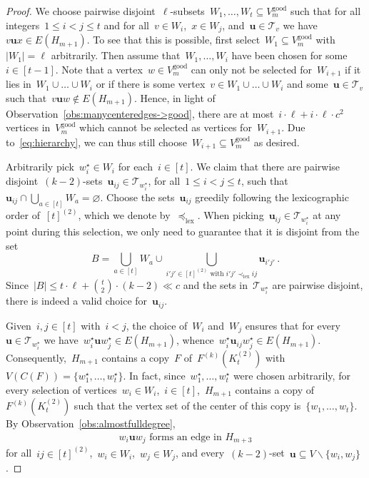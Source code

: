 \documentclass[10pt,a4paper]{amsart}
\let\emptyset=\varnothing
\let\setminus=\smallsetminus
\let\setminus=\smallsetminus
\newcommand{\cT}{\mathcal{T}}
\begin{document}
	\begin{proof}
		
		We choose pairwise disjoint~$\ell$-subsets~$W_1, \ldots, W_t \subseteq V_m^{\text{good}}$ such that for all integers~$1\leq i<j\leq t$ and for all~$v\in W_i$,~$x\in W_j$, and~$\mathbf{u}\in\cT_v$ we have $v\mathbf{u} x\in E(H_{m+1})$.
		To see that this is possible, first select~$W_1\subseteq V_m^{\text{good}}$ with~$\vert W_1\vert=\ell$ arbitrarily.
		Then assume that~$W_1,\dots, W_{i}$ have been chosen for some~$i\in[t-1]$.
		Note that a vertex~$w\in V_m^\text{good}$ can only not be selected for~$W_{i+1}$ if it lies in~$W_1\cup\dots\cup W_i$ or if there is some vertex~$v\in W_1\cup\dots\cup W_i$ and some~$\mathbf{u}\in \cT_v$ such that~$v\mathbf{u}w\notin E(H_{m+1})$.
        Hence, in light of Observation~\ref{obs:manycenteredges->good}, there are at most~$i\cdot \ell+i\cdot \ell\cdot c^2$ vertices in~$V_m^\text{good}$ which cannot be selected as vertices for~$W_{i+1}$.
		Due to~\eqref{eq:hierarchy}, we can thus still choose~$W_{i+1}\subseteq V_m^{\text{good}}$ as desired.
		
		Arbitrarily pick~$w_i^\star \in W_i$ for each~$i \in [t]$.
		We claim that there are pairwise disjoint~$(k-2)$-sets~$\mathbf{u}_{ij}\in\cT_{w_i^\star}$, for all~$1\leq i<j\leq t$, such that~$\mathbf{u}_{ij}\cap\bigcup_{a\in[t]}W_a=\emptyset$.
		Choose the sets~$\mathbf{u}_{ij}$ greedily following the lexicographic order of~$[t]^{(2)}$, which we denote by~$\preceq_{\text{lex}}$. 
		When picking~$\mathbf{u}_{ij}\in\cT_{w_i^\star}$ at any point during this selection, we only need to guarantee that it is disjoint from the set $$B=\bigcup_{a\in[t]}W_a\cup\bigcup_{i'j'\in[t]^{(2)}\text{ with }i'j'\prec_{\text{lex}} ij}\mathbf{u}_{i'j'}\,.$$
		Since~$\vert B\vert\leq t\cdot\ell+\binom{t}{2}\cdot(k-2)\ll c$ and the sets in~$\cT_{w_i^\star}$ are pairwise disjoint, there is indeed a valid choice for~$\mathbf{u}_{ij}$.
		
		Given~$i,j\in[t]$ with~$i<j$, the choice of~$W_i$ and~$W_j$ ensures that for every~$\mathbf{u} \in \cT_{w_i^\star}$ we have~$w_i^\star \mathbf{u} w_j^\star \in E(H_{m+1})$, whence~$w_i^\star \mathbf{u}_{ij} w_j^\star \in E(H_{m+1})$.
		Consequently,~$H_{m+1}$ contains a copy~$F$ of~$F^{(k)}(K_t^{(2)})$ with~$V(C(F))=\{w_1^\star, \ldots, w_t^\star\}$.
		In fact, since~$w_1^\star,\dots,w_t^\star$ were chosen arbitrarily, for every selection of vertices~$w_i\in W_i$,~$i\in[t]$,~$H_{m+1}$ contains a copy of~$F^{(k)}(K_t^{(2)})$ such that the vertex set of the center of this copy is~$\{w_1, \ldots, w_t\}$.
		By Observation~\ref{obs:almostfulldegree},
		\begin{align}\label{eq:edgescliqueextension}
			\text{$w_i\mathbf{u}w_j$ forms an edge in~$H_{m+3}$}
		\end{align}
		for all~$ij\in[t]^{(2)}$,~$w_i\in W_i$,~$w_j\in W_j$, and every~$(k-2)$-set~$\mathbf{u} \subseteq V \setminus \{w_i,w_j\}$.
		

\end{proof}
\end{document}
